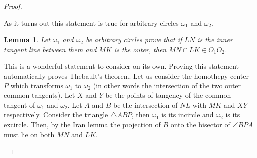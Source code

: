 \documentclass{article}
\newtheorem{lemma}{Lemma}
\begin{document}
\begin{proof}
\begin{center}
\end{center}

As it turns out this statement is true for arbitrary circles \(\omega_1\) and \(\omega_2\).

\begin{lemma}
	Let \(\omega_1\) and \(\omega_2\) be arbitrary circles prove that if \(LN\) is the inner tangent line between them and \(MK\) is the outer, then \(MN \cap LK \in O_1 O_2\).
\end{lemma}

This is a wonderful statement to consider on its own. Proving this statement automatically proves Thebault's theorem. Let us consider the homothepy center \(P\) which transforms \(\omega_1\) to \(\omega_2\) (in other words the intersection of the two outer common tangents). Let \(X\) and \(Y\) be the points of tangency of the common tangent of \(\omega_1\) and \(\omega_2\). Let \(A\) and \(B\) be the intersection of \(NL\) with \(MK\) and \(XY\) respectively. Consider the triangle \(\triangle ABP\), then \(\omega_1\) is its incircle and \(\omega_2\) is its excircle. Then, by the Iran lemma the projection of \(B\) onto the bisector of \(\angle{BPA}\) must lie on both \(MN\) and \(LK\).

\begin{center}
    \centering
\end{center}
\end{proof}
\end{document}
